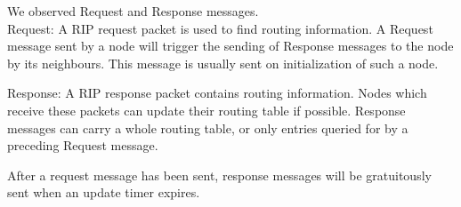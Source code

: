 We observed Request and Response messages. \\
Request:
\indent A RIP request packet is used to find routing information. A Request message sent by a node will trigger the sending of Response messages to the node by its neighbours. This message is usually sent on initialization of such a node.
    
Response:
\indent A RIP response packet contains routing information. Nodes which receive these packets can update their routing table if possible. Response messages can carry a whole routing table, or only entries queried for by a preceding Request message.

After a request message has been sent, response messages will be gratuitously sent when an update timer expires.
